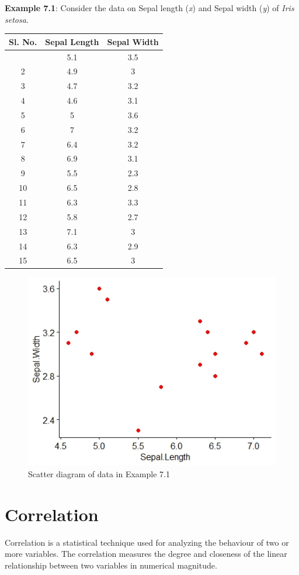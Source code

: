 \documentclass[
]{book}
\begin{document}
\textbf{Example 7.1}: Consider the data on Sepal length (\emph{x}) and Sepal width
(\emph{y}) of \emph{Iris} \emph{setosa.}

\begin{longtable}[]{@{}ccc@{}}
\toprule\noalign{}
Sl. No. & Sepal Length & Sepal Width \\
\midrule\noalign{}
\endhead
\bottomrule\noalign{}
\endlastfoot
1 & 5.1 & 3.5 \\
2 & 4.9 & 3 \\
3 & 4.7 & 3.2 \\
4 & 4.6 & 3.1 \\
5 & 5 & 3.6 \\
6 & 7 & 3.2 \\
7 & 6.4 & 3.2 \\
8 & 6.9 & 3.1 \\
9 & 5.5 & 2.3 \\
10 & 6.5 & 2.8 \\
11 & 6.3 & 3.3 \\
12 & 5.8 & 2.7 \\
13 & 7.1 & 3 \\
14 & 6.3 & 2.9 \\
15 & 6.5 & 3 \\
\end{longtable}

\begin{figure}

{\centering \includegraphics[width=0.5\linewidth]{images/image2c} 

}

\caption{Scatter diagram of data in Example 7.1}\label{fig:c1}
\end{figure}

\section{Correlation}\label{correlation}

Correlation is a statistical technique used for analyzing the behaviour
of two or more variables. The correlation measures the degree and
closeness of the linear relationship between two variables in numerical
magnitude.
\end{document}
